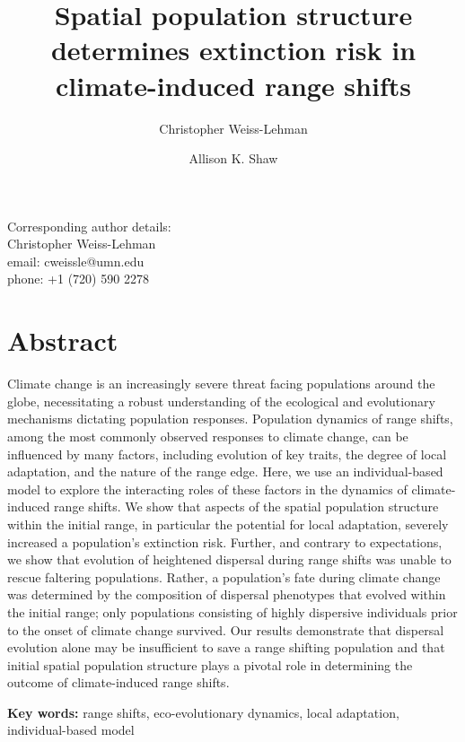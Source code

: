 \documentclass[12pt, oneside]{article}
\title{Spatial population structure determines extinction risk in climate-induced range shifts}
\date{}
\author[1,*]{Christopher Weiss-Lehman}
\author[1]{Allison K. Shaw}
\affil[1]{Ecology, Evolution, and Behavior, University of Minnesota}
\affil[*]{Denotes corresponding author}
\begin{document}
\maketitle

\begin{flushleft}
Corresponding author details: \\
Christopher Weiss-Lehman \\
email: cweissle@umn.edu \\
phone: +1 (720) 590 2278 \\
\end{flushleft}

\doublespacing
\linenumbers

\newpage

\section*{Abstract}
Climate change is an increasingly severe threat facing populations around the globe, necessitating a robust understanding of the ecological and evolutionary mechanisms dictating population responses. Population dynamics of range shifts, among the most commonly observed responses to climate change, can be influenced by many factors, including evolution of key traits, the degree of local adaptation, and the nature of the range edge. Here, we use an individual-based model to explore the interacting roles of these factors in the dynamics of climate-induced range shifts. We show that aspects of the spatial population structure within the initial range, in particular the potential for local adaptation, severely increased a population's extinction risk. Further, and contrary to expectations, we show that evolution of heightened dispersal during range shifts was unable to rescue faltering populations. Rather, a population's fate during climate change was determined by the composition of dispersal phenotypes that evolved within the initial range; only populations consisting of highly dispersive individuals prior to the onset of climate change survived. Our results demonstrate that dispersal evolution alone may be insufficient to save a range shifting population and that initial spatial population structure plays a pivotal role in determining the outcome of climate-induced range shifts.

\begin{flushleft}
\textbf{Key words:} range shifts, eco-evolutionary dynamics, local adaptation, individual-based model
\end{flushleft}
\end{document}
